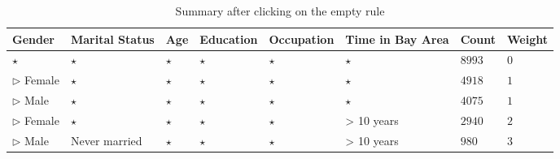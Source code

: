 \documentclass{sig-alternate}
\begin{document}
\begin{table} 
\centering 
\begin{tabular}{| p{1.5cm} | p{1.5cm} | p{1.5cm} | p{1.5cm} | p{1.5cm} | p{1.5cm} | l | l |} 
\hline Gender & Marital Status & Age & Education & Occupation & Time in Bay Area & Count & Weight \\ \hline 
\cline{1-8} $\star$ & $\star$ & $\star$ & $\star$ & $\star$ & $\star$ & $8993$ & $0$ \\
\cline{1-1} \cline{2-2} \cline{3-3} \cline{4-4} \cline{5-5} \cline{6-6} \cline{7-8} $\triangleright$ Female & $\star$ & $\star$ & $\star$ & $\star$ & $\star$ & $4918$ & $1$ \\
\cline{1-1} \cline{2-2} \cline{3-3} \cline{4-4} \cline{5-5} \cline{6-6} \cline{7-8} $\triangleright$ Male & $\star$ & $\star$ & $\star$ & $\star$ & $\star$ & $4075$ & $1$ \\
\cline{1-1} \cline{2-2} \cline{3-3} \cline{4-4} \cline{5-5} \cline{6-6} \cline{7-8} $\triangleright$ Female & $\star$ & $\star$ & $\star$ & $\star$ & > 10 years & $2940$ & $2$ \\
\cline{1-1} \cline{2-2} \cline{3-3} \cline{4-4} \cline{5-5} \cline{6-6} \cline{7-8} $\triangleright$ Male & Never married & $\star$ & $\star$ & $\star$ & > 10 years & $980$ & $3$ \\
\hline 
\end{tabular} 
\caption{Summary after clicking on the empty rule \label{table:uiexample1}} 
\end{table} 
\end{document}
